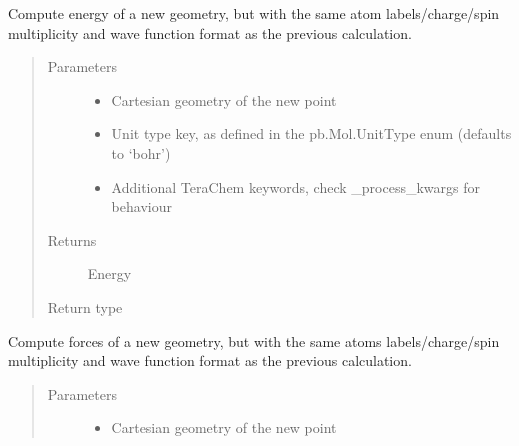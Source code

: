 \documentclass[letterpaper,10pt,english]{sphinxmanual}
\begin{document}
\begin{fulllineitems}

\begin{fulllineitems}
\label{\detokenize{tcpb:tcpb.tcpb.TCProtobufClient.compute_energy}}
Compute energy of a new geometry, but with the same atom labels/charge/spin
multiplicity and wave function format as the previous calculation.
\begin{quote}\begin{description}
\item[{Parameters}] \leavevmode\begin{itemize}
\item {} 
 \textendash{} Cartesian geometry of the new point

\item {} 
 \textendash{} Unit type key, as defined in the pb.Mol.UnitType enum (defaults to ‘bohr’)

\item {} 
 \textendash{} Additional TeraChem keywords, check \_process\_kwargs for behaviour

\end{itemize}

\item[{Returns}] \leavevmode
Energy

\item[{Return type}] \leavevmode
{}

\end{description}\end{quote}

\end{fulllineitems}


\begin{fulllineitems}
\label{\detokenize{tcpb:tcpb.tcpb.TCProtobufClient.compute_forces}}
Compute forces of a new geometry, but with the same atoms labels/charge/spin
multiplicity and wave function format as the previous calculation.
\begin{quote}\begin{description}
\item[{Parameters}] \leavevmode\begin{itemize}
\item {} 
 \textendash{} Cartesian geometry of the new point


\end{itemize}
\end{description}
\end{quote}
\end{fulllineitems}
\end{fulllineitems}
\end{document}
